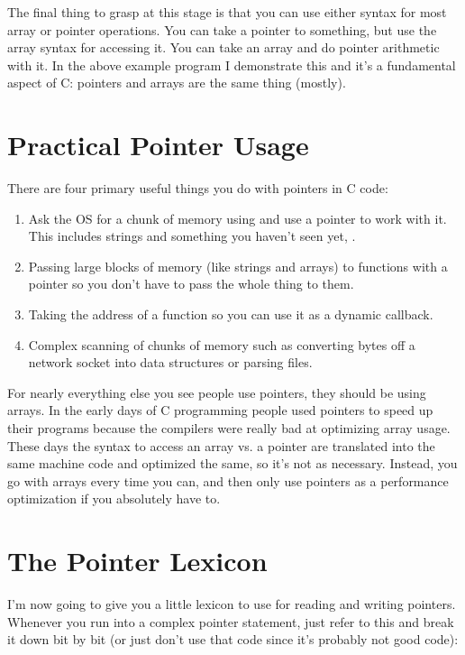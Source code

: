 The final thing to grasp at this stage is that you can use either syntax
for most array or pointer operations.  You can take a pointer to something,
but use the array syntax for accessing it.  You can take an array and do
pointer arithmetic with it.  In the above example program I demonstrate this
and it's a fundamental aspect of C: pointers and arrays are the same thing (mostly).

\section{Practical Pointer Usage}

There are four primary useful things you do with pointers in C code:

\begin{enumerate}
\item Ask the OS for a chunk of memory using  and use a pointer
    to work with it.  This includes strings and something you haven't seen
    yet, .
\item Passing large blocks of memory (like strings and arrays) to functions
    with a pointer so you don't have to pass the whole thing to them.
\item Taking the address of a function so you can use it as a dynamic callback.
\item Complex scanning of chunks of memory such as converting bytes off a network
    socket into data structures or parsing files.
\end{enumerate}

For nearly everything else you see people use pointers, they should be using
arrays.  In the early days of C programming people used pointers to speed
up their programs because the compilers were really bad at optimizing array 
usage.  These days the syntax to access an array vs. a pointer are translated
into the same machine code and optimized the same, so it's not as necessary.
Instead, you go with arrays every time you can, and then only use pointers
as a performance optimization if you absolutely have to.


\section{The Pointer Lexicon}

I'm now going to give you a little lexicon to use for reading and writing
pointers.  Whenever you run into a complex pointer statement, just refer
to this and break it down bit by bit (or just don't use that code since it's
probably not good code):

